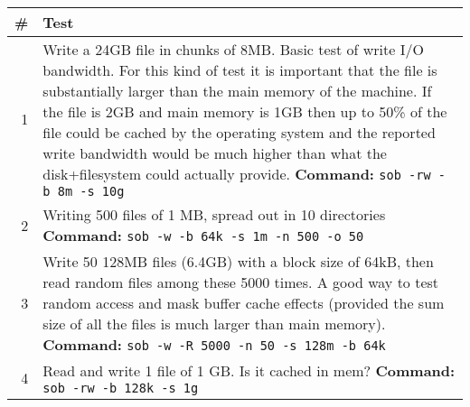 \begin{longtable}[]{@{}rl@{}}
\toprule
\begin{minipage}[b]{0.07\columnwidth}\raggedleft\strut
\#\strut
\end{minipage} & \begin{minipage}[b]{0.15\columnwidth}\raggedright\strut
Test\strut
\end{minipage}\tabularnewline
\midrule
\endhead
\begin{minipage}[t]{0.07\columnwidth}\raggedleft\strut
1\strut
\end{minipage} & \begin{minipage}[t]{0.15\columnwidth}\raggedright\strut
Write a 24GB file in chunks of 8MB. Basic test of write I/O bandwidth.
For this kind of test it is important that the file is substantially
larger than the main memory of the machine. If the file is 2GB and main
memory is 1GB then up to 50\% of the file could be cached by the
operating system and the reported write bandwidth would be much higher
than what the disk+filesystem could actually provide. \textbf{Command:}
\texttt{sob\ -rw\ -b\ 8m\ -s\ 10g}\strut
\end{minipage}\tabularnewline
\begin{minipage}[t]{0.07\columnwidth}\raggedleft\strut
2\strut
\end{minipage} & \begin{minipage}[t]{0.15\columnwidth}\raggedright\strut
Writing 500 files of 1 MB, spread out in 10 directories
\textbf{Command:}
\texttt{sob\ -w\ -b\ 64k\ -s\ 1m\ -n\ 500\ -o\ 50}\strut
\end{minipage}\tabularnewline
\begin{minipage}[t]{0.07\columnwidth}\raggedleft\strut
3\strut
\end{minipage} & \begin{minipage}[t]{0.15\columnwidth}\raggedright\strut
Write 50 128MB files (6.4GB) with a block size of 64kB, then read random
files among these 5000 times. A good way to test random access and mask
buffer cache effects (provided the sum size of all the files is much
larger than main memory). \textbf{Command:}
\texttt{sob\ -w\ -R\ 5000\ -n\ 50\ -s\ 128m\ -b\ 64k}\strut
\end{minipage}\tabularnewline
\begin{minipage}[t]{0.07\columnwidth}\raggedleft\strut
4\strut
\end{minipage} & \begin{minipage}[t]{0.15\columnwidth}\raggedright\strut
Read and write 1 file of 1 GB. Is it cached in mem? \textbf{Command:}
\texttt{sob\ -rw\ -b\ 128k\ -s\ 1g}\strut
\end{minipage}\tabularnewline
\bottomrule
\end{longtable}

